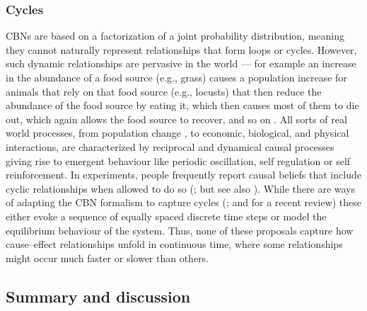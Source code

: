 \documentclass{cambridge7A}%
\begin{document}
\subsubsection{Cycles}

CBNs are based on a factorization of a joint probability distribution, meaning they cannot naturally represent relationships that form loops or cycles.  However, such dynamic relationships are pervasive in the world --- for example an increase in the abundance of a food source (e.g., grass) causes a population increase for animals that rely on that food source (e.g., locusts) that then reduce the abundance of the food source by eating it, which then causes most of them to die out, which again allows the food source to recover, and so on \citep{white2008beliefs,odum1959fundamentals}.  All sorts of real world processes, from population change \citep{malthus1888essay}, to economic, biological, and physical interactions, are characterized by reciprocal and dynamical causal processes giving rise to emergent behaviour like periodic oscillation, self regulation or self reinforcement.  In experiments, people frequently report causal beliefs that include cyclic relationships when allowed to do so (\citealp{nikolic2015there,kim2002clinical,sloman1998feature,rottman2014children}; but see also \citealp{white2008beliefs}).
While there are ways of adapting the CBN formalism to capture cycles (\citealp[e.g.][]{dean1989model,lauritzen2002chain}; and \citealp{rehder2016cycles} for a recent review) these either evoke a sequence of equally spaced discrete time steps or model the equilibrium behaviour of the system.  Thus, none of these proposals capture how cause--effect relationships unfold in continuous time, where some relationships might occur much faster or slower than others.

\subsection{Summary and discussion}
\end{document}
